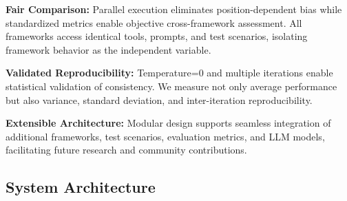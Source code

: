 \documentclass[sigconf,nonacm]{acmart}
\begin{document}
\textbf{Fair Comparison:} Parallel execution eliminates position-dependent bias while standardized metrics enable objective cross-framework assessment. All frameworks access identical tools, prompts, and test scenarios, isolating framework behavior as the independent variable.

\textbf{Validated Reproducibility:} Temperature=0 and multiple iterations enable statistical validation of consistency. We measure not only average performance but also variance, standard deviation, and inter-iteration reproducibility.

\textbf{Extensible Architecture:} Modular design supports seamless integration of additional frameworks, test scenarios, evaluation metrics, and LLM models, facilitating future research and community contributions.

\subsection{System Architecture}
\end{document}
